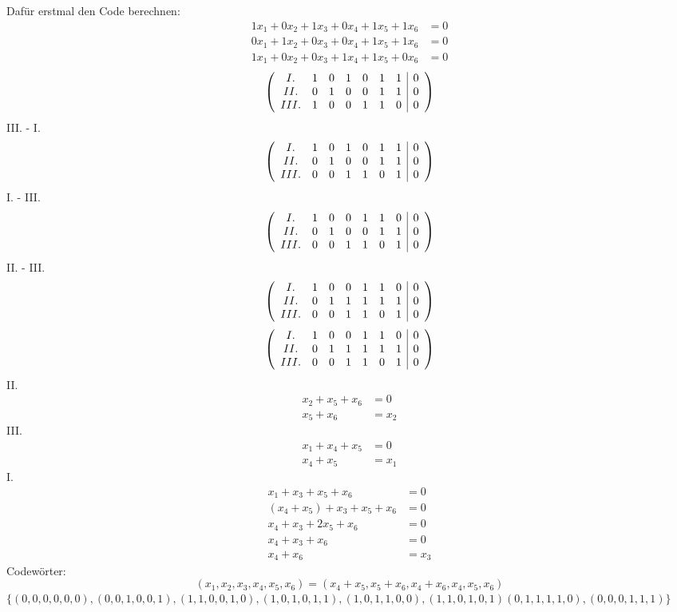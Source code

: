 \documentclass{article} %
\begin{document}
\begin{mybox}
Dafür erstmal den Code berechnen: 
\[
\begin{aligned}
1x_1 + 0x_2 + 1x_3 + 0x_4 + 1x_5 + 1x_6 &= 0 \\
0x_1 + 1x_2 + 0x_3 + 0x_4 + 1x_5 + 1x_6 &= 0 \\
1x_1 + 0x_2 + 0x_3 + 1x_4 + 1x_5 + 0x_6 &= 0
\end{aligned}
\]
\[
\left( \begin{array}{c cccccc|c}
I. &1 & 0 & 1 & 0 & 1 & 1 & 0 \\
II. & 0 & 1 & 0 & 0 & 1 & 1 & 0 \\
III. & 1 & 0 & 0 & 1 & 1 & 0 & 0
\end{array} \right)
\]
III. - I. 
\[
\left( \begin{array}{c cccccc|c}
I. & 1 & 0 & 1 & 0 & 1 & 1 & 0 \\
II. & 0 & 1 & 0 & 0 & 1 & 1 & 0 \\
III. & 0 & 0 & 1 & 1 & 0 & 1 & 0
\end{array} \right)
\]
I. - III. 
\[
\left( \begin{array}{c cccccc|c}
I.      & 1 & 0 & 0 & 1 & 1 & 0 & 0 \\
II.     & 0 & 1 & 0 & 0 & 1 & 1 & 0 \\
III.    & 0 & 0 & 1 & 1 & 0 & 1 & 0
\end{array} \right)
\]
II. - III. 
\[
\left( \begin{array}{c cccccc|c}
I.      & 1 & 0 & 0 & 1 & 1 & 0 & 0 \\
II.     & 0 & 1 & 1 & 1 & 1 & 1 & 0 \\
III.    & 0 & 0 & 1 & 1 & 0 & 1 & 0
\end{array} \right)
\]
\[
\left( \begin{array}{c cccccc|c}
I.      & 1 & 0 & 0 & 1 & 1 & 0 & 0 \\
II.     & 0 & 1 & 1 & 1 & 1 & 1 & 0 \\
III.    & 0 & 0 & 1 & 1 & 0 & 1 & 0
\end{array} \right)
\]
II. 
\begin{align*}
    x_2+x_5+x_6& =0 \\
    x_5+x_6& = x_2
\end{align*}
III. 
\begin{align*}
    x_1+x_4+x_5& =0 \\
    x_4+x_5& = x_1
\end{align*}
I.
\begin{align*}
   x_1+x_3+x_5+x_6 & =0 \\
   (x_4+x_5)+x_3+x_5+x_6 & =0 \\
   x_4+x_3+2x_5+x_6 & =0 \\
   x_4+x_3+x_6 & =0 \\
   x_4+x_6 & = x_3
\end{align*}
Codewörter: 
\[
(x_1, x_2, x_3, x_4, x_5, x_6) = (x_4 + x_5, x_5 + x_6, x_4 + x_6, x_4, x_5, x_6)
\]
$\{(0,0,0,0,0,0), (0,0,1,0,0,1), (1,1,0,0,1,0), (1,0,1,0,1,1), (1,0,1,1,0,0), (1,1,0,1,0,1)
(0,1,1,1,1,0), (0,0,0,1,1,1)\}$
\end{mybox}
\end{document}
